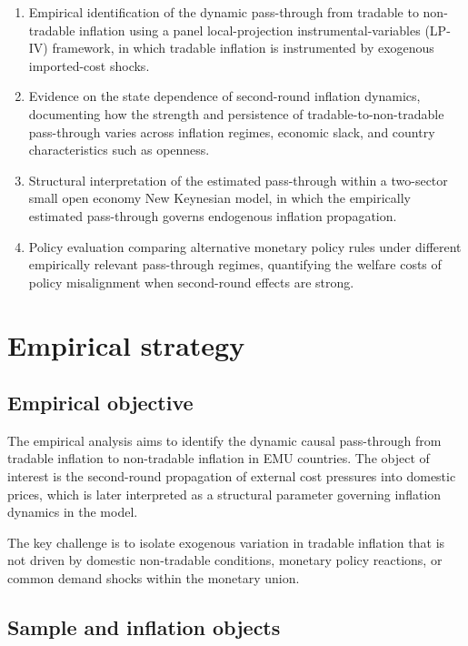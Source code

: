 \documentclass[11pt]{article}
\begin{document}
\begin{enumerate}
\item Empirical identification of the dynamic pass-through from tradable to non-tradable inflation using a panel local-projection instrumental-variables (LP-IV) framework, in which tradable inflation is instrumented by exogenous imported-cost shocks.

\item Evidence on the state dependence of second-round inflation dynamics, documenting how the strength and persistence of tradable-to-non-tradable pass-through varies across inflation regimes, economic slack, and country characteristics such as openness.

\item Structural interpretation of the estimated pass-through within a two-sector small open economy New Keynesian model, in which the empirically estimated pass-through governs endogenous inflation propagation.

\item Policy evaluation comparing alternative monetary policy rules under different empirically relevant pass-through regimes, quantifying the welfare costs of policy misalignment when second-round effects are strong.
\end{enumerate}


\section{Empirical strategy}

\subsection{Empirical objective}

The empirical analysis aims to identify the dynamic causal pass-through from tradable inflation to non-tradable inflation in EMU countries. The object of interest is the second-round propagation of external cost pressures into domestic prices, which is later interpreted as a structural parameter governing inflation dynamics in the model.

The key challenge is to isolate exogenous variation in tradable inflation that is not driven by domestic non-tradable conditions, monetary policy reactions, or common demand shocks within the monetary union.

\subsection{Sample and inflation objects}
\end{document}
